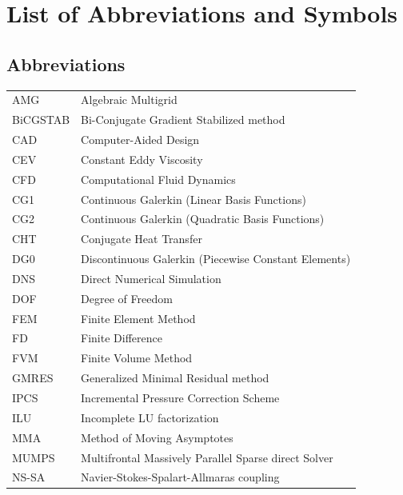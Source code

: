 \documentclass[master=ewtk,masteroption=,openany]{kulemt}
\begin{document}
\listoffiguresandtables


\raggedbottom
\chapter{List of Abbreviations and Symbols}

\section*{Abbreviations}
\begin{flushleft}
	\small
	\renewcommand{\arraystretch}{1.0}
	\begin{tabularx}{\textwidth}{@{}p{35mm}X@{}}
		AMG & Algebraic Multigrid \\
		BiCGSTAB & Bi-Conjugate Gradient Stabilized method \\
		CAD & Computer-Aided Design \\
		CEV & Constant Eddy Viscosity \\
		CFD & Computational Fluid Dynamics \\
		CG1 & Continuous Galerkin (Linear Basis Functions) \\
		CG2 & Continuous Galerkin (Quadratic Basis Functions) \\
		CHT & Conjugate Heat Transfer \\
		DG0 & Discontinuous Galerkin (Piecewise Constant Elements) \\
		DNS & Direct Numerical Simulation \\
		DOF & Degree of Freedom \\
		FEM & Finite Element Method \\
		FD & Finite Difference \\
		FVM & Finite Volume Method \\
		GMRES & Generalized Minimal Residual method \\
		IPCS & Incremental Pressure Correction Scheme \\
		ILU & Incomplete LU factorization \\
		MMA & Method of Moving Asymptotes \\
		MUMPS & Multifrontal Massively Parallel Sparse direct Solver \\
		NS-SA & Navier-Stokes-Spalart-Allmaras coupling \\

\end{tabularx}
\end{flushleft}
\end{document}
